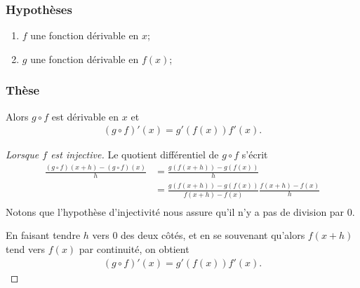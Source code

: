 \documentclass[main.tex]{subfiles}
\begin{document}
\begin{proposition}

    \subsubsection{Hypothèses}

    \begin{enumerate}
        \item $f$ une fonction dérivable en $x$;
        \item $g$ une fonction dérivable en $f(x)$;
    \end{enumerate}

    \subsubsection{Thèse}

    Alors $g \circ f$ est dérivable en $x$ et
    \begin{align}
        (g \circ f)'(x) = g'(f(x)) f'(x).
    \end{align}
\end{proposition}
\begin{proof}[Lorsque $f$ est injective]
    Le quotient différentiel de $g \circ f$ s'écrit
    \begin{align}
        \frac {(g \circ f)(x + h) - (g \circ f)(x)} h
        &= \frac {g(f(x + h)) - g(f(x))} h\\
        &= \frac {g(f(x + h)) - g(f(x))} {f(x + h) - f(x)} \frac {f(x + h) - f(x)} h\\
    \end{align}
    Notons que l'hypothèse d'injectivité nous assure qu'il n'y a pas de division par $0$.

    En faisant tendre $h$ vers $0$ des deux côtés,
    et en se souvenant qu'alors $f(x + h)$ tend vers $f(x)$ par continuité,
    on obtient
    \begin{align}
        (g \circ f)'(x) = g'(f(x)) f'(x).
    \end{align}
\end{proof}
\end{document}
